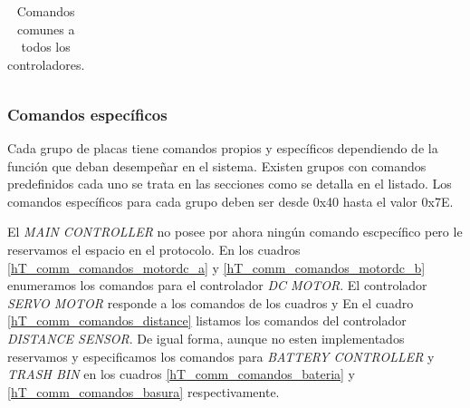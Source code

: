 \begin{table}[ht]
\begin{center}
\begin{tabular}{|l|}
			\hline
		\end{tabular}
		\caption{Comandos comunes a todos los controladores. }
		\label{hT_comm_comandos_comunes}
	\end{center}
\end{table}

\subsubsection{Comandos espec\'ificos}
\label{h_comm_protocolo_comandosEspecificos}

Cada grupo de placas tiene comandos propios y espec\'ificos dependiendo de la funci\'on que deban desempe\~nar en el sistema.
Existen grupos con comandos predefinidos cada uno se trata en las secciones como se detalla en el listado.
Los comandos espec\'ificos para cada grupo deben ser desde 0x40 hasta el valor 0x7E.

El \emph{MAIN CONTROLLER} no posee por ahora ning\'un comando escpec\'ifico pero le reservamos el espacio en el protocolo.
En los cuadros \ref{hT_comm_comandos_motordc_a} y \ref{hT_comm_comandos_motordc_b} enumeramos los comandos para el
controlador \emph{DC MOTOR}.
El controlador \emph{SERVO MOTOR} responde a los comandos de los cuadros \label{hT_comm_comandos_servo_a}
y \label{hT_comm_comandos_servo_b}
En el cuadro \ref{hT_comm_comandos_distance} listamos los comandos del controlador \emph{DISTANCE SENSOR}.
De igual forma, aunque no esten implementados reservamos y especificamos los comandos para \emph{BATTERY CONTROLLER} y
\emph{TRASH BIN} en los cuadros \ref{hT_comm_comandos_bateria} y \ref{hT_comm_comandos_basura} respectivamente.

